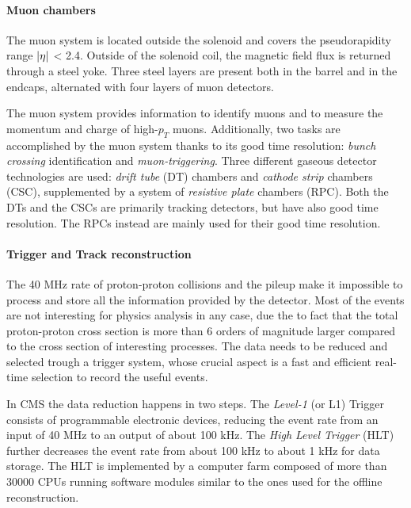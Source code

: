 \paragraph{Muon chambers}

The muon system is located outside the solenoid and covers the pseudorapidity range
$\abs{\eta}$ < 2.4. Outside of the solenoid coil, the magnetic field flux is returned through a steel
yoke. Three steel layers are present both in the barrel and in the endcaps, alternated with
four layers of muon detectors.


The muon system provides information to identify muons and to measure the momentum
and charge of high-$p_T$ muons. Additionally, two tasks are accomplished by the muon system thanks to its good time resolution: \emph{bunch crossing} identification and \emph{muon-triggering}.
Three different gaseous detector technologies are used: \emph{drift tube} (DT) chambers and \emph{cathode strip} chambers (CSC), supplemented by a system of \emph{resistive plate} chambers (RPC). Both the DTs and the CSCs are primarily tracking detectors, but have also
good time resolution. The RPCs instead are mainly used for their good time resolution.


\paragraph{Trigger and Track reconstruction}

The 40 MHz rate of proton-proton collisions and the pileup make it impossible to process
and store all the information provided by the detector. Most of the events are not interesting
for physics analysis in any case, due the to fact that the total proton-proton cross section
is more than 6 orders of magnitude larger compared to the cross section of interesting processes. The data needs to be reduced and selected trough a trigger system, whose crucial
aspect is a fast and efficient real-time selection to record the useful events.

In CMS the data reduction happens in two steps. The \emph{Level-1} (or L1) Trigger consists of programmable electronic devices, reducing  the event rate from an input of 40 MHz to an output of about 100 kHz. The
\emph{High Level Trigger} (HLT) further decreases the event rate from about 100 kHz to about 1 kHz for data storage. The HLT is implemented by a computer farm composed of more than 30000 CPUs
running software modules similar to the ones used for the offline reconstruction. 

